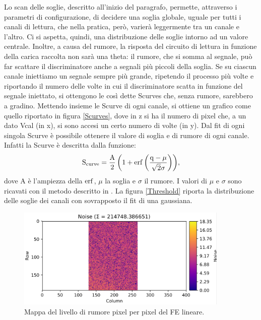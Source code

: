 Lo scan delle soglie, descritto all'inizio del paragrafo, permette, attraverso i parametri di configurazione, di decidere una soglia globale, uguale per tutti i canali di lettura, che nella pratica, però, varierà leggermente tra un canale e l'altro. 
Ci si aspetta, quindi, una distribuzione delle soglie intorno ad un valore centrale.
Inoltre, a causa del rumore, la risposta del circuito di lettura in funzione della carica raccolta non sarà una theta: il rumore, che si somma al segnale, può far scattare il discriminatore anche a segnali più piccoli della soglia.
Se su ciascun canale iniettiamo un segnale sempre più grande, ripetendo il processo più volte e riportando il numero delle volte in cui il discriminatore scatta in funzione del segnale iniettato, si ottengono le così dette Scurves che, senza rumore, sarebbero a gradino. 
Mettendo insieme le Scurve di ogni canale, si ottiene un grafico come quello riportato in figura \ref{Scurves}, dove in z si ha il numero di pixel che, a un dato Vcal (in x), si sono accesi un certo numero di volte (in y).
Dal fit di ogni singola Scurve è possibile ottenere il valore di soglia e di rumore di ogni canale.
Infatti la Scurve è descritta dalla funzione:
\begin{equation}
  \mathrm{S_{curve} = \frac{A}{2} \left( 1 + \operatorname{erf} \left( \frac{q-\mu}{\sqrt{2}\sigma} \right) \right)},
\end{equation}
dove A è l'ampiezza della $\operatorname{erf}$, $\mu$ la soglia e $\sigma$ il rumore.
I valori di $\mu$ e $\sigma$ sono ricavati con il metodo descritto in \cite{ERF}.
La figura \ref{Threshold} riporta la distribuzione delle soglie dei canali con sovrapposto il fit di una gaussiana.
\begin{figure}
\centering
\includegraphics[width=0.9\textwidth]{Immagini/NoiseMap}
\caption{Mappa del livello di rumore pixel per pixel del FE lineare.}
\label{NoiseMap}
\end{figure}
